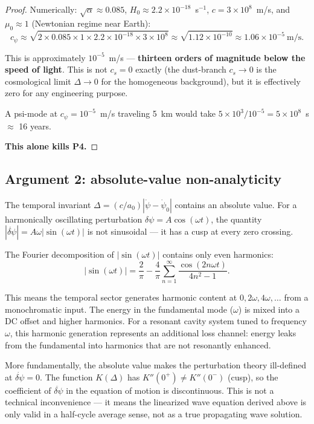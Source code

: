 \documentclass[11pt]{article}
\newcommand{\ee}[1]{\times 10^{#1}}
\begin{document}
\begin{proof}
Numerically: $\sqrt{\alpha} \approx 0.085$, $H_0 \approx 2.2\ee{-18}$~s$^{-1}$,
$c = 3\ee{8}$~m/s, and $\mu_0 \approx 1$ (Newtonian regime near Earth):
\begin{equation}
\boxed{c_\psi \approx \sqrt{2 \times 0.085 \times 1 \times 2.2\ee{-18} \times 3\ee{8}}
\approx \sqrt{1.12\ee{-10}} \approx 1.06\ee{-5}~\text{m/s}.}
\label{eq:c-psi}
\end{equation}

This is approximately $10^{-5}$~m/s --- \textbf{thirteen orders of magnitude
below the speed of light}. This is not $c_s = 0$ exactly (the dust-branch
$c_s \to 0$ is the cosmological limit $\Delta \to 0$ for the homogeneous
background), but it is effectively zero for any engineering purpose.

A psi-mode at $c_\psi = 10^{-5}$~m/s traveling 5~km would take
$5\ee{3}/10^{-5} = 5\ee{8}$~s $\approx$ 16 years.

\textbf{This alone kills P4.}
\end{proof}

\subsection{Argument 2: absolute-value non-analyticity}

The temporal invariant $\Delta = (c/a_0)|\dot\psi - \dot\psi_0|$ contains
an absolute value. For a harmonically oscillating perturbation
$\delta\psi = A\cos(\omega t)$, the quantity $|\dot{\delta\psi}| =
A\omega|\sin(\omega t)|$ is not sinusoidal --- it has a cusp at every
zero crossing.

The Fourier decomposition of $|\sin(\omega t)|$ contains only even
harmonics:
\begin{equation}
|\sin(\omega t)| = \frac{2}{\pi} - \frac{4}{\pi}\sum_{n=1}^{\infty}
\frac{\cos(2n\omega t)}{4n^2 - 1}.
\end{equation}

This means the temporal sector generates harmonic content at $0, 2\omega,
4\omega, \ldots$ from a monochromatic input. The energy in the fundamental
mode ($\omega$) is mixed into a DC offset and higher harmonics. For a
resonant cavity system tuned to frequency $\omega$, this harmonic generation
represents an additional loss channel: energy leaks from the fundamental
into harmonics that are not resonantly enhanced.

More fundamentally, the absolute value makes the perturbation theory
ill-defined at $\dot{\delta\psi} = 0$. The function $K(\Delta)$ has
$K''(0^+) \neq K''(0^-)$ (cusp), so the coefficient of $\ddot{\delta\psi}$
in the equation of motion is discontinuous. This is not a technical
inconvenience --- it means the linearized wave equation derived above
is only valid in a half-cycle average sense, not as a true propagating
wave solution.
\end{document}
